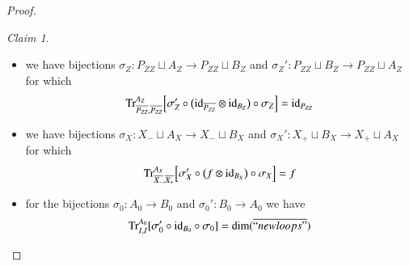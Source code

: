 \documentclass{amsart}
\def\tn{\textnormal}
\def\dim{\tn{dim}}
\def\Trace{\tn{Tr}}
\def\to{\rightarrow}
\def\ol{\overline}
\def\id{\tn{id}}
\newcommand{\inp}[1]{{#1_-}}
\newcommand{\outp}[1]{{#1_+}}
\theoremstyle{remark}
\newtheorem{claim}[subsection]{Claim}
\theoremstyle{definition}
\begin{document}
\begin{proof}
\begin{claim}\mbox{}
 \begin{itemize}
  \item we have bijections $\sigma_Z:P_{ZZ}\sqcup A_Z\to P_{ZZ}\sqcup B_Z$ and $\sigma_Z':P_{ZZ}\sqcup B_Z\to P_{ZZ}\sqcup A_Z$ for which
  \[\Trace_{\ol{P_{ZZ}},\ol{P_{ZZ}}}^{A_Z}\Big[\sigma_Z'\circ\big(\id_{\ol{P_{ZZ}}}\otimes\id_{B_Z}\big)\circ\sigma_Z\Big]=\id_{P_{ZZ}}\]
  \item we have bijections $\sigma_X:\inp{X}\sqcup A_X\to \inp{X}\sqcup B_X$ and $\sigma_X':\outp{X}\sqcup B_X\to \outp{X}\sqcup A_X$ for which
  \[\Trace_{\ol{\inp{X}},\ol{\outp{X}}}^{A_X}\Big[\sigma_X'\circ\big(f\otimes\id_{B_X}\big)\circ\sigma_X\Big]=f\]
  \item for the bijections $\sigma_0:A_0\to B_0$ and $\sigma_0':B_0\to A_0$ we have
  \[\Trace_{I,I}^{A_0}[\sigma_0'\circ\id_{B_0}\circ\sigma_0]=\dim(\ol{``newloops"})\]
 \end{itemize}
\end{claim}


\end{proof}
\end{document}
